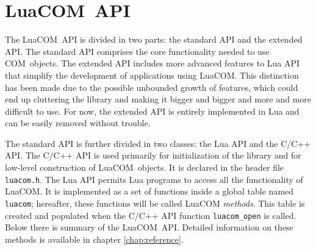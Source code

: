 \documentclass[11pt,a4paper,english]{report}
\newcommand{\ident}[1]{\mbox{\texttt{#1}}}
\newcommand{\techname}[1]{\mbox{#1}}
\newcommand{\com}{\techname{COM}}
\newcommand{\luacom}{\techname{LuaCOM}}
\begin{document}

\section{\luacom\ API}

  The \luacom\ API is divided in two parts: the standard API and the
  extended API. The standard API comprises the core functionality
  needed to use \com\ objects. The extended API includes more advanced
  features to Lua API that simplify the development of applications
  using \luacom. This distinction has been made due to the possible
  unbounded growth of features, which could end up cluttering the
  library and making it bigger and bigger and more and more difficult
  to use. For now, the extended API is entirely implemented in Lua
  and can be easily removed without trouble.

  The standard API is further divided in two classes: the Lua API and
  the C/C++ API. The C/C++ API is used primarily for initialization of
  the library and for low-level construction of \luacom\ objects. It
  is declared in the header file \ident{luacom.h}. The Lua API
  permits Lua programs to access all the functionality of \luacom. It
  is implemented as a set of functions inside a global table named
  \verb+luacom+; hereafter, these functions will be called LuaCOM
  \emph{methods}. This table is created and populated when the C/C++ API function
  \ident{luacom\_open} is called. Below there is summary of
  the \luacom\ API. Detailed information on these methods is available
  in chapter \ref{chap:reference}.

  \newcommand{\colA}{6}

\end{document}
